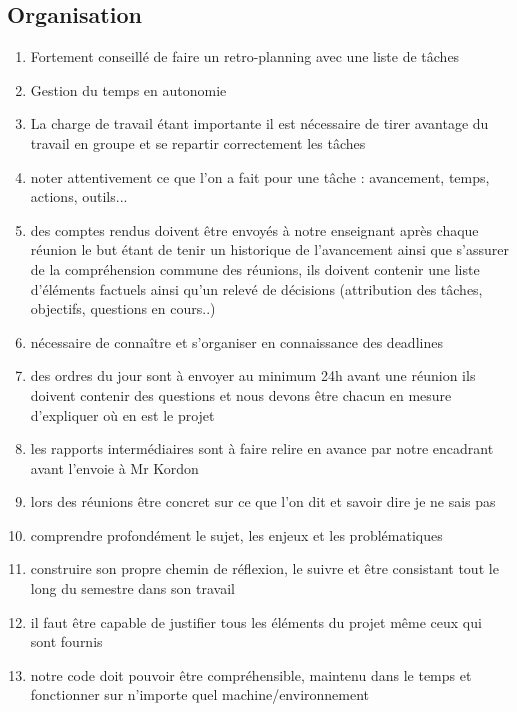 \documentclass{article}
\begin{document}
\subsection{Organisation}
\begin{enumerate}
    \item Fortement conseillé de faire un retro-planning avec une liste de tâches
    \item Gestion du temps en autonomie
    \item La charge de travail étant importante il est nécessaire de tirer avantage du travail en groupe et se repartir correctement les tâches
    \item noter attentivement ce que l’on a fait pour une tâche : avancement, temps, actions, outils...
    \item des comptes rendus doivent être envoyés à notre enseignant après chaque réunion le but étant de tenir un historique de l’avancement ainsi que s’assurer de la compréhension commune des réunions, ils doivent contenir une liste d’éléments factuels ainsi qu’un relevé de décisions (attribution des tâches, objectifs, questions en cours..)
    \item nécessaire de connaître et s’organiser en connaissance des deadlines
    \item des ordres du jour sont à envoyer au minimum 24h avant une réunion ils doivent contenir des questions et nous devons être chacun en mesure d’expliquer où en est le projet
    \item les rapports intermédiaires sont à faire relire en avance par notre encadrant avant l’envoie à Mr Kordon
    \item lors des réunions être concret sur ce que l’on dit et savoir dire je ne sais pas
    \item comprendre profondément le sujet, les enjeux et les problématiques
    \item construire son propre chemin de réflexion, le suivre et être consistant tout le long du semestre dans son travail
    \item il faut être capable de justifier tous les éléments du projet même ceux qui sont fournis
    \item notre code doit pouvoir être compréhensible, maintenu dans le temps et fonctionner sur n’importe quel machine/environnement
\end{enumerate}
\end{document}
